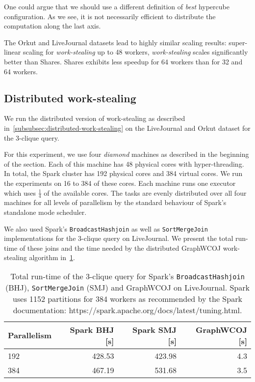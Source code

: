 One could argue that we should use a different definition of \textit{best} hypercube configuration.
As we see, it is not necessarily efficient to distribute the computation along the last axis.

The Orkut and LiveJournal datasets lead to highly similar scaling results:
super-linear scaling for \textit{work-stealing} up to 48 workers,
\textit{work-stealing} scales significantly better than Shares.
Shares exhibits less speedup for 64 workers than for 32 and 64 workers.

\subsection{Distributed work-stealing}\label{subsec:distributed-work-stealing}
We run the distributed version of work-stealing as described in~\cref{subsubsec:distributed-work-stealing}
on the LiveJournal and Orkut dataset for the 3-clique query.

For this experiment, we use four \textit{diamond} machines as described in the beginning of the section.
Each of this machine has 48 physical cores with hyper-threading.
In total, the Spark cluster has 192 physical cores and 384 virtual cores.
We run the experiments on 16 to 384 of these cores.
Each machine runs one executor which uses $\frac{1}{4}$ of the available cores.
The tasks are evenly distributed over all four machines for all levels of parallelism by
the standard behaviour of Spark's standalone mode scheduler.

We also used Spark's \texttt{BroadcastHashjoin} as well as \texttt{SortMergeJoin} implementations
for the 3-clique query on LiveJournal.
We present the total run-time of these joins and the time needed by the distributed GraphWCOJ work-stealing
algorithm in~\cref{table:spark-vs-distributed-work-stealing}.

\begin{table}
	\centering
    \begin{tabular}{lrrr}
        \toprule
        Parallelism & Spark BHJ [s] & Spark SMJ [s] & GraphWCOJ [s] \\ \midrule
        192         &  428.53       &  423.98       &  4.3          \\
        384         &  467.19       &  531.68       &  3.5          \\
        \bottomrule
    \end{tabular}
    \caption{
    	Total run-time of the 3-clique query for Spark's \texttt{BroadcastHashjoin} (BHJ),
    	\texttt{SortMergeJoin} (SMJ) and GraphWCOJ on LiveJournal.
    	    	Spark uses 1152 partitions for 384 workers as recommended by the Spark documentation: https://spark.apache.org/docs/latest/tuning.html.}
    \label{table:spark-vs-distributed-work-stealing}
\end{table}

